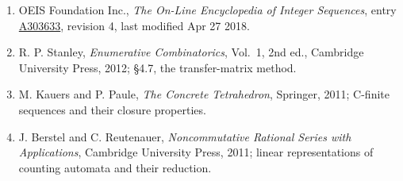 \documentclass[11pt]{article}
\theoremstyle{definition}
\begin{document}
\begin{enumerate}

\item OEIS Foundation Inc., \emph{The On-Line Encyclopedia of Integer Sequences}, entry \href{https://oeis.org/A303633}{A303633}, revision 4, last modified Apr 27 2018.

\item R. P. Stanley, \emph{Enumerative Combinatorics}, Vol.~1, 2nd ed., Cambridge University Press, 2012; \S4.7, the transfer-matrix method.

\item M. Kauers and P. Paule, \emph{The Concrete Tetrahedron}, Springer, 2011; C-finite sequences and their closure properties.

\item J. Berstel and C. Reutenauer, \emph{Noncommutative Rational Series with Applications}, Cambridge University Press, 2011; linear representations of counting automata and their reduction.

\end{enumerate}
\end{document}
